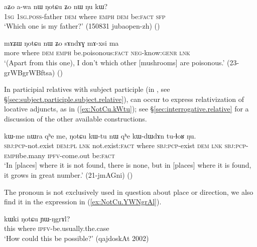 \begin{exe}
\ex \label{ex:NotCu.Zo.nW}
\gll  aʑo a-wa nɯ ŋotɕu ʑo nɯ ŋu kɯ? \\
\textsc{1sg} \textsc{1sg}.\textsc{poss}-father \textsc{dem} where \textsc{emph} \textsc{dem} be:\textsc{fact} \textsc{sfp} \\
\glt `Which one is my father?' (150831 jubaopen-zh)
()
\end{exe} 

\begin{exe}
\ex \label{ex:NotCu.nW.Zo.sAndAG}
\gll  mɤʑɯ ŋotɕu nɯ ʑo sɤndɤɣ mɤ-xsi ma \\
more where \textsc{dem} \textsc{emph} be.poisonous:\textsc{fact} \textsc{neg}-know:\textsc{genr} \textsc{lnk} \\
\glt `(Apart from this one), I don't which other [mushrooms] are poisonous.' (23-grWBgrWBftsa) ()
\end{exe} 

In participial relatives with subject participle (in , see §\ref{sec:subject.participle.subject.relative}),  can occur to express relativization of locative adjuncts, as in  (\ref{ex:NotCu.kWtu}); see §\ref{sec:interrogative.relative} for a discussion of the other available constructions.

\begin{exe}
\ex \label{ex:NotCu.kWtu}
\gll kɯ-me nɯra qʰe me,  ŋotɕu kɯ-tu nɯ qʰe kɯ-dɯ\redp{}dɤn tu-ɬoʁ ŋu. \\
\textsc{sbj}:\textsc{pcp}-not.exist \textsc{dem}:\textsc{pl} \textsc{lnk} not.exist:\textsc{fact} where \textsc{sbj}:\textsc{pcp}-exist \textsc{dem} \textsc{lnk} \textsc{sbj}:\textsc{pcp}-\textsc{emph}\redp{}be.many \textsc{ipfv}-come.out be:\textsc{fact} \\
\glt `In [places] where it is not found, there is none, but in [places] where it is found, it grows in great number.' (21-jmAGni) ()
\end{exe} 

The pronoun  is not exclusively used in question about place or direction, we also find it in the expression in (\ref{ex:NotCu.YWNgrAl}).

 \begin{exe}
\ex \label{ex:NotCu.YWNgrAl}
\gll  kɯki ŋotɕu ɲɯ-ŋgrɤl?   \\
 this where \textsc{ipfv}-be.usually.the.case \\
\glt `How could this be possible?'  (qajdoskAt 2002)
\end{exe} 

